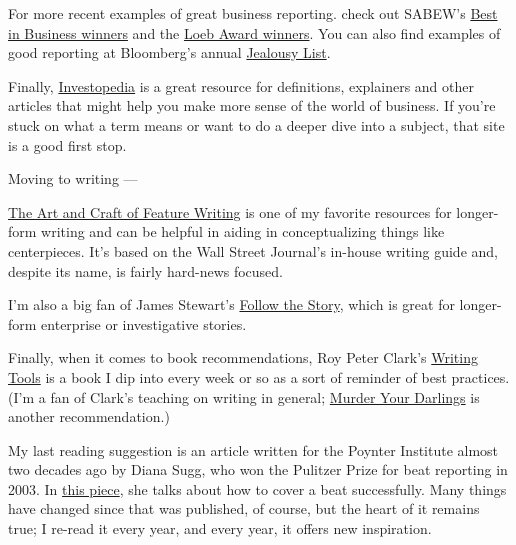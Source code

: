 \documentclass[
  11pt,
  american,
  letterpaperpaper,
  extrafontsizes,onecolumn,openright
  ]{memoir}
\begin{document}
For more recent examples of great business reporting. check out SABEW's \href{https://sabew.org/contestsawards/best-in-business-past-honorees/}{Best in Business winners} and the \href{http://theloebawards.com/}{Loeb Award winners}. You can also find examples of good reporting at Bloomberg's annual \href{https://www.google.com/search?q=bloomberg+jealousy+list\&rlz=1C5GCEM_enUS1022US1022\&oq=bloomberg+jealous\&gs_lcrp=EgZjaHJvbWUqBggBEEUYOzIGCAAQRRg5MgYIARBFGDvSAQg0MTgyajBqN6gCALACAA\&sourceid=chrome\&ie=UTF-8}{Jealousy List}.

Finally, \href{https://www.investopedia.com/}{Investopedia} is a great resource for definitions, explainers and other articles that might help you make more sense of the world of business. If you're stuck on what a term means or want to do a deeper dive into a subject, that site is a good first stop.

Moving to writing ---

\href{https://www.amazon.com/Art-Craft-Feature-Writing-Journal/dp/0452261589/ref=sr_1_1}{The Art and Craft of Feature Writing} is one of my favorite resources for longer-form writing and can be helpful in aiding in conceptualizing things like centerpieces. It's based on the Wall Street Journal's in-house writing guide and, despite its name, is fairly hard-news focused.

I'm also a big fan of James Stewart's \href{https://www.amazon.com/Follow-Story-Write-Successful-Nonfiction/dp/0684850672/ref=sr_1_1}{Follow the Story}, which is great for longer-form enterprise or investigative stories.

Finally, when it comes to book recommendations, Roy Peter Clark's \href{https://www.amazon.com/Writing-Tools-Essential-Strategies-Writer/dp/0316014990/ref=sr_1_1}{Writing Tools} is a book I dip into every week or so as a sort of reminder of best practices. (I'm a fan of Clark's teaching on writing in general; \href{https://www.amazon.com/Murder-Your-Darlings-Writing-Aristotle/dp/0316481882/ref=tmm_hrd_swatch_0}{Murder Your Darlings} is another recommendation.)

My last reading suggestion is an article written for the Poynter Institute almost two decades ago by Diana Sugg, who won the Pulitzer Prize for beat reporting in 2003. In \href{https://acbj-my.sharepoint.com/personal/tgibbons_bizjournals_com/_layouts/15/onedrive.aspx?id=\%2Fpersonal\%2Ftgibbons\%5Fbizjournals\%5Fcom\%2FDocuments\%2FTurn\%20the\%20Beat\%20Around\%5FPoynter\%2Epdf\&parent=\%2Fpersonal\%2Ftgibbons\%5Fbizjournals\%5Fcom\%2FDocuments}{this piece}, she talks about how to cover a beat successfully. Many things have changed since that was published, of course, but the heart of it remains true; I re-read it every year, and every year, it offers new inspiration.
\end{document}
